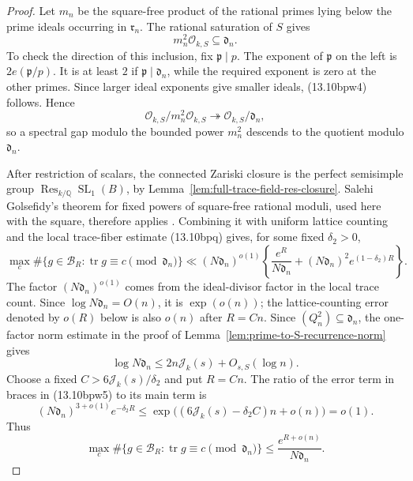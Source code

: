 \documentclass[11pt,reqno]{amsart}
\theoremstyle{definition}
\theoremstyle{remark}
\newcommand{\Q}{\mathbb Q}
\newcommand{\cO}{\mathcal O}
\newcommand{\Tr}{\operatorname{tr}}
\newcommand{\SL}{\operatorname{SL}}
\begin{document}
\begin{proof}
Let \(m_n\) be the square-free product of the rational primes lying below
the prime ideals occurring in \(\mathfrak r_n\).  The rational saturation
of \(S\) gives
\[
 m_n^2\cO_{k,S}\subseteq\mathfrak d_n.
\tag{13.10bpw4}
\]
To check the direction of this inclusion, fix
\(\mathfrak p\mid p\).  The exponent of \(\mathfrak p\) on the left is
\(2e(\mathfrak p/p)\).  It is at least \(2\) if
\(\mathfrak p\mid\mathfrak d_n\), while the required exponent is zero at
the other primes.  Since larger ideal exponents give smaller ideals,
(13.10bpw4) follows.  Hence
\[
 \cO_{k,S}/m_n^2\cO_{k,S}\twoheadrightarrow
 \cO_{k,S}/\mathfrak d_n,
\]
so a spectral gap modulo the bounded power \(m_n^2\) descends to the
quotient modulo \(\mathfrak d_n\).

After restriction of scalars, the connected Zariski closure is the perfect
semisimple group \(\operatorname{Res}_{k/\Q}\SL_1(B)\), by
Lemma~\ref{lem:full-trace-field-res-closure}.  Salehi Golsefidy's theorem
for fixed powers of square-free rational moduli, used here with the square,
therefore applies \cite{SalehiSuperII}.  Combining it with uniform lattice
counting and the local trace-fiber estimate (13.10bpq) gives, for some
fixed \(\delta_2>0\),
\[
 \max_c\#\{g\in\mathcal B_R:
             \Tr g\equiv c\pmod{\mathfrak d_n}\}
 \ll
 (N\mathfrak d_n)^{o(1)}
 \left\{
   \frac{e^R}{N\mathfrak d_n}
   +(N\mathfrak d_n)^2e^{(1-\delta_2)R}
 \right\}.
\tag{13.10bpw5}
\]
The factor \((N\mathfrak d_n)^{o(1)}\) comes from the ideal-divisor
factor in the local trace count.  Since
\(\log N\mathfrak d_n=O(n)\), it is \(\exp(o(n))\); the
lattice-counting error denoted by \(o(R)\) below is also \(o(n)\) after
\(R=Cn\).  Since
\((Q_n^2)\subseteq\mathfrak d_n\), the one-factor norm estimate in the
proof of Lemma~\ref{lem:prime-to-S-recurrence-norm} gives
\[
 \log N\mathfrak d_n
 \le 2n\mathcal J_k(s)+O_{s,S}(\log n).
\tag{13.10bpw6}
\]
Choose a fixed \(C>6\mathcal J_k(s)/\delta_2\) and put \(R=Cn\).
The ratio of the error term in braces in (13.10bpw5) to its main term is
\[
 (N\mathfrak d_n)^{3+o(1)}e^{-\delta_2R}
 \le
 \exp\bigl((6\mathcal J_k(s)-\delta_2C)n+o(n)\bigr)=o(1).
\]
Thus
\[
 \max_c\#\{g\in\mathcal B_R:
             \Tr g\equiv c\pmod{\mathfrak d_n}\}
 \le\frac{e^{R+o(n)}}{N\mathfrak d_n}.
\tag{13.10bpw7}
\]


\end{proof}
\end{document}
